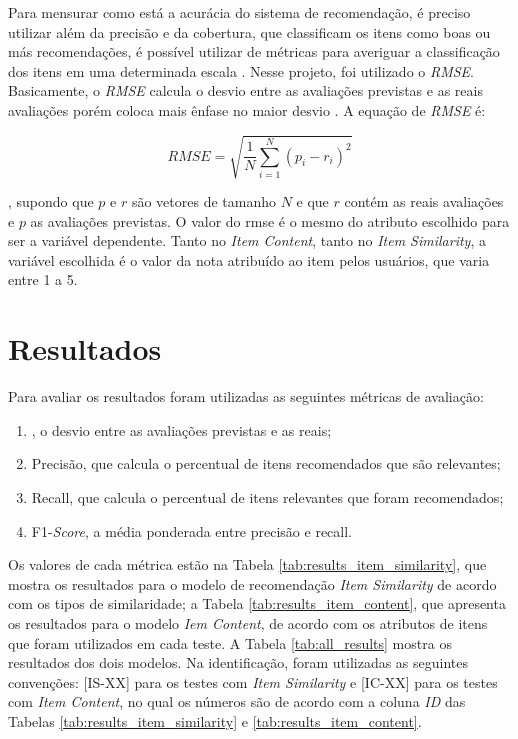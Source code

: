 Para mensurar como está a acurácia do sistema de recomendação, é preciso utilizar além da precisão e da cobertura, que classificam os itens como boas ou más recomendações, é possível utilizar de métricas para averiguar a classificação dos itens em uma determinada escala \citep{Jannach:2010:RSI:1941904}. Nesse projeto, foi utilizado o \textit{RMSE}. Basicamente, o \textit{RMSE} calcula o desvio entre as avaliações previstas e as reais avaliações porém coloca mais ênfase no maior desvio \citep{Jannach:2010:RSI:1941904}. A equação de \textit{RMSE} é:

\begin{equation}
    RMSE = \sqrt{\frac{1}{N} \sum_{i=1}^{N} (p_i - r_i)^2}
\end{equation}

, supondo que $p$ e $r$ são vetores de tamanho $N$ e que $r$ contém as reais avaliações e $p$ as avaliações previstas. O valor do \ac{rmse} é o mesmo do atributo escolhido para ser a variável dependente. Tanto no \textit{Item Content}, tanto no \textit{Item Similarity}, a variável escolhida é o valor da nota atribuído ao item pelos usuários, que varia entre 1 a 5.

\section{Resultados}

Para avaliar os resultados foram utilizadas as seguintes métricas de avaliação:

\renewcommand{\labelenumi}{\roman{enumi})}
\begin{enumerate}
    \item {}, o desvio entre as avaliações previstas e as reais;
    \item Precisão, que calcula o percentual de itens recomendados que são relevantes;
    \item Recall, que calcula o percentual de itens relevantes que foram recomendados;
    \item F1-\textit{Score}, a média ponderada entre precisão e recall.
\end{enumerate}

Os valores de cada métrica estão na Tabela \ref{tab:results_item_similarity}, que mostra os resultados para o modelo de recomendação \textit{Item Similarity} de acordo com os tipos de similaridade; a Tabela \ref{tab:results_item_content}, que apresenta os resultados para o modelo \textit{Iem Content}, de acordo com os atributos de itens que foram utilizados em cada teste. A Tabela \ref{tab:all_results} mostra os resultados dos dois modelos. Na identificação, foram utilizadas as seguintes convenções: [IS-XX] para os testes com \textit{Item Similarity} e [IC-XX] para os testes com \textit{Item Content}, no qual os números são de acordo com a coluna \textit{ID} das Tabelas \ref{tab:results_item_similarity} e \ref{tab:results_item_content}.

